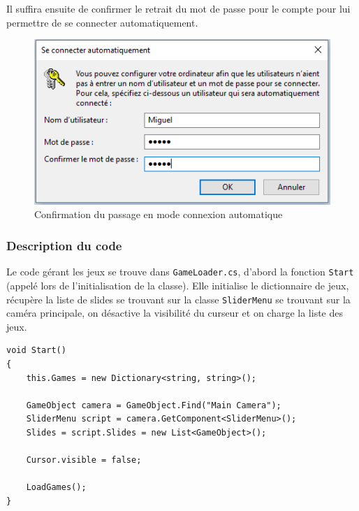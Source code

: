 \documentclass[12pt]{article}
\begin{document}
Il suffira ensuite de confirmer le retrait du mot de passe pour le compte pour lui permettre de se connecter automatiquement.

\clearpage

\begin{figure}[h]
    \centering
    \includegraphics[scale=.6]{confirm_session.png}
    \caption{Confirmation du passage en mode connexion automatique}
    \label{fig:confirm_password}
\end{figure}

\subsubsection{Description du code}
Le code gérant les jeux se trouve dans \texttt{GameLoader.cs}, d'abord la fonction \texttt{Start} (appelé lors de l'initialisation de la classe). Elle initialise le dictionnaire de jeux, récupère la liste de slides se trouvant sur la classe \texttt{SliderMenu} se trouvant sur la caméra principale, on désactive la visibilité du curseur et on charge la liste des jeux.
\begin{lstlisting}
void Start()
{
    this.Games = new Dictionary<string, string>();

    GameObject camera = GameObject.Find("Main Camera");
    SliderMenu script = camera.GetComponent<SliderMenu>();
    Slides = script.Slides = new List<GameObject>();

    Cursor.visible = false;

    LoadGames();
}
\end{lstlisting}
\end{document}
